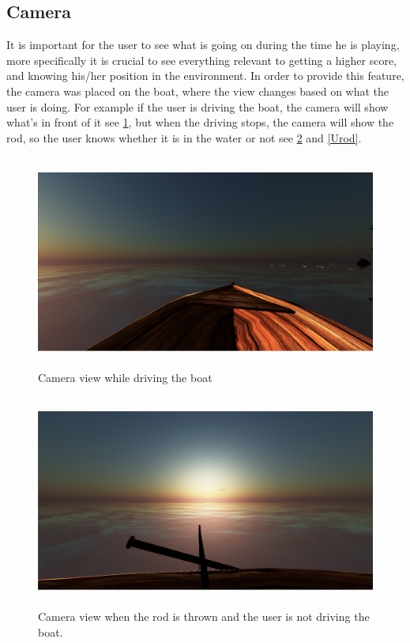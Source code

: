 \documentclass[paper=a4, fontsize=11pt]{scrartcl} %
\numberwithin{equation}{section} %
\numberwithin{figure}{section} %
\numberwithin{table}{section} %
\begin{document}
\subsection{Camera}

It is important for the user to see what is going on during the time he is playing, more specifically it is crucial to see everything relevant to getting a higher score, and knowing his/her position in the environment. In order to provide this feature, the camera was placed on the boat, where the view changes based on what the user is doing. For example if the user is driving the boat, the camera will show what's in front of it see \ref{boat view}, but when the driving stops, the camera will show the rod, so the user knows whether it is in the water or not see \ref{Drod} and \ref{Urod}.

\begin{figure}[!ht]
\centering
\includegraphics[width=15cm, height=7cm]{boatview.png}
\caption{Camera view while driving the boat}
\label{boat view}
\end{figure}

\begin{figure}[!ht]
\centering
\includegraphics[width=15cm, height=7cm]{thrownrod.png}
\caption{Camera view when the rod is thrown and the user is not driving the boat.}
\label{Drod}
\end{figure}
\end{document}
